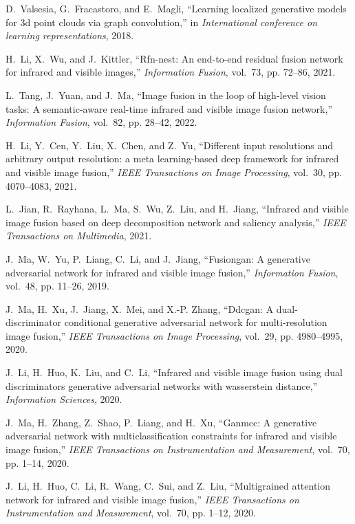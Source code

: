 \documentclass[journal]{IEEEtran}
\begin{document}
\begin{thebibliography}{10}
D.~Valsesia, G.~Fracastoro, and E.~Magli, ``Learning localized generative
  models for 3d point clouds via graph convolution,'' in \emph{International
  conference on learning representations}, 2018.

H.~Li, X.~Wu, and J.~Kittler, ``Rfn-nest: An end-to-end residual fusion network
  for infrared and visible images,'' \emph{Information Fusion}, vol.~73, pp.
  72--86, 2021.

L.~Tang, J.~Yuan, and J.~Ma, ``Image fusion in the loop of high-level vision
  tasks: A semantic-aware real-time infrared and visible image fusion
  network,'' \emph{Information Fusion}, vol.~82, pp. 28--42, 2022.

H.~Li, Y.~Cen, Y.~Liu, X.~Chen, and Z.~Yu, ``Different input resolutions and
  arbitrary output resolution: a meta learning-based deep framework for
  infrared and visible image fusion,'' \emph{IEEE Transactions on Image
  Processing}, vol.~30, pp. 4070--4083, 2021.

L.~Jian, R.~Rayhana, L.~Ma, S.~Wu, Z.~Liu, and H.~Jiang, ``Infrared and visible
  image fusion based on deep decomposition network and saliency analysis,''
  \emph{IEEE Transactions on Multimedia}, 2021.

J.~Ma, W.~Yu, P.~Liang, C.~Li, and J.~Jiang, ``Fusiongan: A generative
  adversarial network for infrared and visible image fusion,''
  \emph{Information Fusion}, vol.~48, pp. 11--26, 2019.

J.~Ma, H.~Xu, J.~Jiang, X.~Mei, and X.-P. Zhang, ``Ddcgan: A dual-discriminator
  conditional generative adversarial network for multi-resolution image
  fusion,'' \emph{IEEE Transactions on Image Processing}, vol.~29, pp.
  4980--4995, 2020.

J.~Li, H.~Huo, K.~Liu, and C.~Li, ``Infrared and visible image fusion using
  dual discriminators generative adversarial networks with wasserstein
  distance,'' \emph{Information Sciences}, 2020.

J.~Ma, H.~Zhang, Z.~Shao, P.~Liang, and H.~Xu, ``Ganmcc: A generative
  adversarial network with multiclassification constraints for infrared and
  visible image fusion,'' \emph{IEEE Transactions on Instrumentation and
  Measurement}, vol.~70, pp. 1--14, 2020.

J.~Li, H.~Huo, C.~Li, R.~Wang, C.~Sui, and Z.~Liu, ``Multigrained attention
  network for infrared and visible image fusion,'' \emph{IEEE Transactions on
  Instrumentation and Measurement}, vol.~70, pp. 1--12, 2020.


\end{thebibliography}
\end{document}
